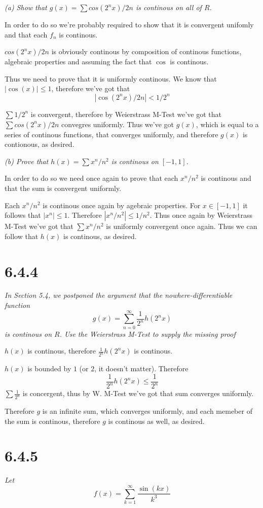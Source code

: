 \documentclass[11pt,oneside,titlepage]{book}
\begin{document}
\textit{(a) Show that $g(x) = \sum cos(2^nx)/2n$ is continous on all of $R$.}

In order to do so we're probably required to show that it is
convergent unifomly and that each $f_n$ is continous.

$cos(2^nx)/2n$ is obviously continous by composition of continous  functions,
algebraic properties and assuming the fact that $\cos$ is continous.

Thus we need to prove that it is uniformly continous. 
We know  that $|\cos(x)| \leq 1$, therefore  we've got that
$$|\cos(2^nx)/2n| < 1/2^n$$

$\sum 1/2^n$ is convergent, therefore by Weierstrass M-Test we've got that
$\sum cos(2^nx)/2n$  convegres uniformly. Thus we've got $g(x)$,
which is equal to a series of continous functions, that converges uniformly,
and therefore $g(x)$ is contionous, as desired.

\textit{(b) Prove that $h(x) = \sum x^n/n^2$ is continous on $[-1, 1]$.}

In order to do so we need once again to prove that each $x^n/n^2$ is continous
and that the sum is convergent uniformly.

Each $x^n/n^2$ is continous once again by agebraic properties. For
$x \in [-1, 1]$ it follows that $|x^n| \leq 1 $. Therefore
$|x^n/n^2| \leq 1/n^2$. Thus once again by Weierstrass M-Test we've got that
$\sum x^n/n^2$ is uniformly convergent once again. Thus we can follow that
$h(x)$ is continous, as desired.

\section*{6.4.4}
\textit{In Section 5.4, we postponed the argument that the
  nowhere-differentiable function}
$$g(x) = \sum_{n = 0}^{\infty}{\frac{1}{2^n}h(2^nx)}$$
\textit{is continous on $R$. Use the Weierstrass M-Test to supply the missing
  proof}

$h(x)$ is continous, therefore $\frac{1}{2^n}h(2^nx)$ is continous.

$h(x)$ is bounded by $1$ (or $2$, it doesn't matter). Therefore
$$\frac{1}{2^n}h(2^nx) \leq \frac{1}{2^n}$$
$\sum \frac{1}{2^n}$ is concergent, thus by W. M-Test we've got that sum
converges uniformly.

Therefore $g$ is an infinite sum, which converges uniformly, and each
memeber of the sum is continous, therefore $g$ is continous as well, as
desired.

\section*{6.4.5}
\textit{Let }
$$f(x) = \sum_{k = 1}^{\infty}{\frac{\sin(kx)}{k^3}}$$
\end{document}
